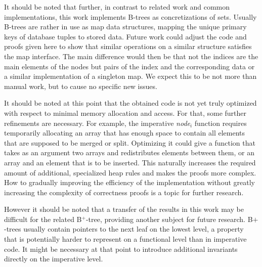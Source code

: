 It should be noted that further,
in contrast to related work and common implementations,
this work implements B-trees as concretizations of sets.
Usually B-trees are rather in use as map data structures,
mapping the unique primary keys
of database tuples to stored data.
Future work could adjust the code and proofs given here
to show that similar operations on a similar structure satisfies
the map interface.
The main difference would then be that not the indices
are the main elements of the nodes but pairs of the 
index and the corresponding data or a similar
implementation of a singleton map.
We expect this to be not more than manual work,
but to cause no specific new issues.

It should be noted at this point that the obtained code is not yet
truly optimized with respect to minimal memory allocation and access.
For that, some further refinements are necessary.
For example, the imperative \textit{node$_i$} function
requires temporarily allocating
an array that has enough space to contain
all elements that are supposed to be merged or split.
Optimizing it could give a function that takes
as an argument two arrays and redistributes elements between them,
or an array and an element that is to be inserted.
This naturally increases the required amount of additional,
specialized heap rules and makes the proofs more complex.
How to gradually improving the efficiency of the implementation
without greatly increasing the complexity of correctness
proofs is a topic for further research.


However it should be noted that a transfer of the results in
this work may be difficult for the related B$^+$-tree,
providing another subject for future research.
B$+$-trees usually contain pointers to the next leaf
on the lowest level, a property that is potentially harder
to represent on a functional level than in imperative code.
It might be necessary at that point to introduce additional
invariants directly on the imperative level.